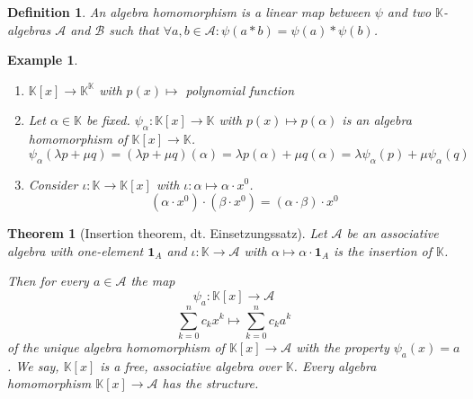 \documentclass{article}
\newtheorem{theorem}{Theorem}  \numberwithin{theorem}{section}
\newtheorem{example}{Example}  \numberwithin{example}{section}
\newtheorem{definition}{Definition}  \numberwithin{definition}{section}
\begin{document}
\begin{definition} %
  An algebra homomorphism is a linear map between $\psi$ and two $\mathbb K$-algebras $\mathcal A$ and $\mathcal B$ such that
  $\forall a,b \in \mathcal A: \psi(a * b) = \psi(a) * \psi(b)$.
\end{definition}

\begin{example} %
  \begin{enumerate}
    \item $\mathbb K[x] \to \mathbb K^{\mathbb K}$ with $p(x) \mapsto$ polynomial function
    \item
      Let $\alpha \in \mathbb K$ be fixed.
      $\psi_{\alpha}: \mathbb K[x] \to \mathbb K$ with $p(x) \mapsto p(\alpha)$ is an algebra homomorphism of $\mathbb K[x] \to \mathbb K$.
      \[ \psi_\alpha(\lambda p + \mu q) = (\lambda p + \mu q)(\alpha) = \lambda p(\alpha) + \mu q(\alpha) = \lambda \psi_{\alpha}(p) + \mu \psi_{\alpha}(q) \]
    \item Consider $\iota: \mathbb K \to \mathbb K[x]$ with $\iota: \alpha \mapsto \alpha \cdot x^0$.
      \[ (\alpha \cdot x^0) \cdot (\beta \cdot x^0) = (\alpha \cdot \beta) \cdot x^0 \]
  \end{enumerate}
\end{example}

\begin{theorem}[Insertion theorem, dt. \foreignlanguage{german}{Einsetzungssatz}] %
  Let $\mathcal A$ be an associative algebra with one-element $\mathbf 1_A$
  and $\iota: \mathbb K \to \mathcal A$ with $\alpha \mapsto \alpha \cdot \mathbf 1_A$ is the insertion of $\mathbb K$.

  Then for every $a \in \mathcal A$ the map
  \[ \psi_a: \mathbb K[x] \to \mathcal A \]
  \[ \sum_{k=0}^n c_k x^k \mapsto \sum_{k=0}^n c_k a^k \]
  of the unique algebra homomorphism of $\mathbb K[x] \to \mathcal A$ with the property $\psi_a(x) = a$.
  We say, $\mathbb K[x]$ is a \emph{free, associative algebra over $\mathbb K$}.
  Every algebra homomorphism $\mathbb K[x] \to \mathcal A$ has the structure.
\end{theorem}



\printindex
\end{document}
